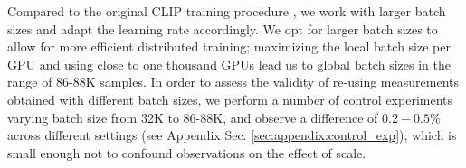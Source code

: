 \documentclass[11pt,table]{article}
\newcommand{\citep}{\cite}
\begin{document}

Compared to the original CLIP training procedure \citep{radford2021learning}, we work with larger batch sizes and adapt the learning rate accordingly.
We opt for larger batch sizes to allow for more efficient distributed training; maximizing the local batch size per GPU and using close to one thousand GPUs lead us to global batch sizes in the range of 86-88K samples.
In order to assess the validity of re-using measurements obtained with different batch sizes, we perform a number of control experiments varying batch size from 32K to 86-88K, and observe a difference of $0.2-0.5\%$ across different settings (see Appendix Sec. \ref{sec:appendix:control_exp}), which is small enough not to confound observations on the effect of scale.
\end{document}

